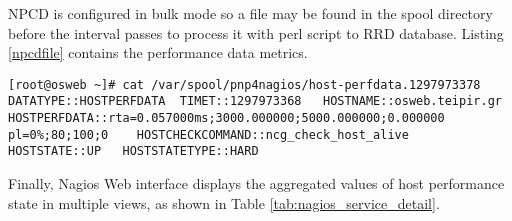 NPCD is configured in bulk mode so a file may be found in the spool directory before the interval passes to process it with perl script to RRD database. Listing \ref{npcdfile} contains the performance data metrics.

\begin{lstlisting}[caption=NPCD temporary file in spool directory,label=npcdfile]
[root@osweb ~]# cat /var/spool/pnp4nagios/host-perfdata.1297973378 
DATATYPE::HOSTPERFDATA	TIMET::1297973368	HOSTNAME::osweb.teipir.gr	HOSTPERFDATA::rta=0.057000ms;3000.000000;5000.000000;0.000000 pl=0%;80;100;0	HOSTCHECKCOMMAND::ncg_check_host_alive	HOSTSTATE::UP	HOSTSTATETYPE::HARD
\end{lstlisting}

Finally, Nagios Web interface displays the aggregated values of host performance state in multiple views, as shown in Table \ref{tab:nagios_service_detail}.

\begin{table}[ht]
\small\addtolength{\tabcolsep}{-3pt}
\caption{Example Nagios service status details for ganglia check}
\label{tab:nagios_service_detail}
\end{table}

